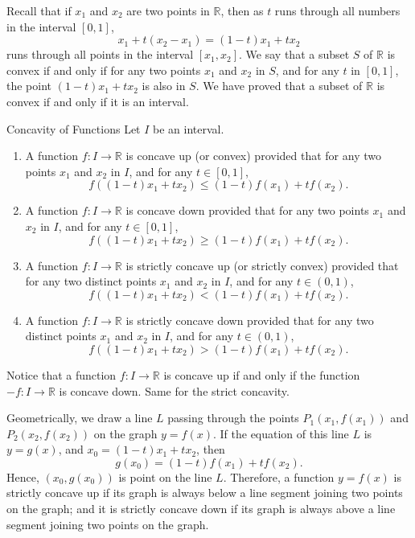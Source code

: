 \begin{example}{}
Recall that if $x_1$ and $x_2$ are two points in $\mathbb{R}$, then as $t$ runs through all numbers in the interval $[0,1]$, 
\[x_1+t(x_2-x_1)=(1-t)x_1+tx_2\]runs through all points in the interval $[x_1, x_2]$. We say that a subset $S$ of $\mathbb{R}$ is convex if and only if for any two points $x_1$ and $x_2$ in $S$, and for any $t$ in $[0, 1]$, the point $(1-t)x_1+tx_2$ is also in $S$. We have proved that a subset of $\mathbb{R}$ is convex if and only if it is an interval.
\begin{definition}{Concavity of Functions}
Let $I$ be an interval.
\begin{enumerate}[1.]
\item A function $f:I\rightarrow \mathbb{R}$ is   concave up (or convex) provided that for any two points $x_1$ and $x_2$ in $I$, and for any $t\in [0,1]$,
    \[f((1-t)x_1+tx_2)\leq (1-t)f(x_1)+tf(x_2).\]
 \item A function $f:I\rightarrow \mathbb{R}$ is   concave down provided that for any  two points $x_1$ and $x_2$ in $I$, and for any $t\in [0,1]$,
   \[f((1-t)x_1+tx_2)\geq (1-t)f(x_1)+tf(x_2).\]
\item A function $f:I\rightarrow \mathbb{R}$ is strictly  concave up (or strictly convex)  provided that for any two distinct points $x_1$ and $x_2$ in $I$, and for any $t\in (0,1)$,
    \[f((1-t)x_1+tx_2)<(1-t)f(x_1)+tf(x_2).\]
 \item A function $f:I\rightarrow \mathbb{R}$ is strictly concave  down  provided that for any two distinct points $x_1$ and $x_2$ in $I$, and for any $t\in (0,1)$,
   \[f((1-t)x_1+tx_2)> (1-t)f(x_1)+tf(x_2).\]
\end{enumerate}
\end{definition}

Notice that a function $f:I\to\mathbb{R}$ is concave up if and only if the function $-f:I\to\mathbb{R}$ is concave down. Same for the strict concavity.

Geometrically, we draw a line   $L$ passing through the points $P_1(x_1, f(x_1))$  and $P_2(x_2, f(x_2))$ on the graph $y=f(x)$. If the equation of this line $L$ is $y=g(x)$, and $x_0=(1-t)x_1+tx_2$,  then 
\[g(x_0)= (1-t)f(x_1)+tf(x_2).\] Hence, $(x_0, g(x_0))$ is  point on the line $L$. Therefore, a function $y=f(x)$ is strictly concave up if its graph is always below a line segment joining two points on the graph; and it is strictly concave down if its graph is always above a line segment joining two points on the graph.



\end{example}
